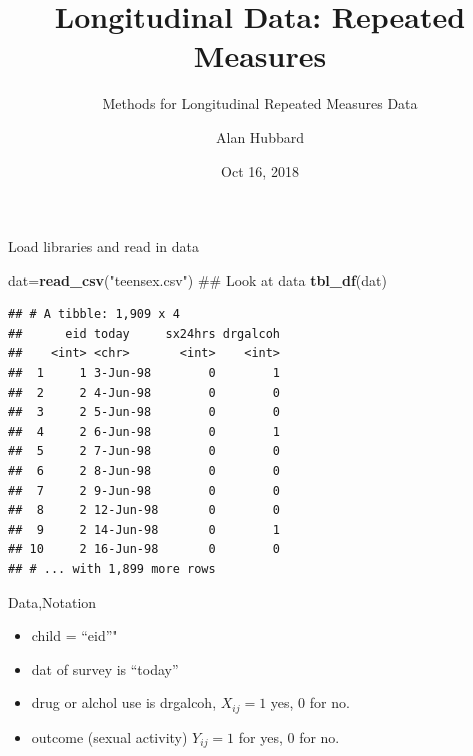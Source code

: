 \documentclass[ignorenonframetext,]{beamer}
\title{Longitudinal Data: Repeated Measures}
\subtitle{Methods for Longitudinal Repeated Measures Data}
\author{Alan Hubbard}
\date{Oct 16, 2018}
\newenvironment{Shaded}{\begin{snugshade}}{\end{snugshade}}
\newcommand{\KeywordTok}[1]{\textcolor[rgb]{0.13,0.29,0.53}{\textbf{#1}}}
\newcommand{\StringTok}[1]{\textcolor[rgb]{0.31,0.60,0.02}{#1}}
\newcommand{\NormalTok}[1]{#1}
\providecommand{\tightlist}{%
  \setlength{\itemsep}{0pt}\setlength{\parskip}{0pt}}
\begin{document}
\frame{\titlepage}

\begin{frame}[fragile]{Load libraries and read in data}

\begin{Shaded}
\begin{Highlighting}[]
\NormalTok{dat=}\KeywordTok{read_csv}\NormalTok{(}\StringTok{"teensex.csv"}\NormalTok{)}
\NormalTok{## Look at data}
\KeywordTok{tbl_df}\NormalTok{(dat)}
\end{Highlighting}
\end{Shaded}

\begin{verbatim}
## # A tibble: 1,909 x 4
##      eid today     sx24hrs drgalcoh
##    <int> <chr>       <int>    <int>
##  1     1 3-Jun-98        0        1
##  2     2 4-Jun-98        0        0
##  3     2 5-Jun-98        0        0
##  4     2 6-Jun-98        0        1
##  5     2 7-Jun-98        0        0
##  6     2 8-Jun-98        0        0
##  7     2 9-Jun-98        0        0
##  8     2 12-Jun-98       0        0
##  9     2 14-Jun-98       0        1
## 10     2 16-Jun-98       0        0
## # ... with 1,899 more rows
\end{verbatim}

\end{frame}

\begin{frame}{Data,Notation}

\begin{itemize}
\tightlist
\item
  child = ``eid''"
\item
  dat of survey is ``today''
\item
  drug or alchol use is drgalcoh, \(X_{ij} = 1\) yes, 0 for no.
\item
  outcome (sexual activity) \(Y_{ij} = 1\) for yes, 0 for no.
\end{itemize}

\end{frame}
\end{document}

